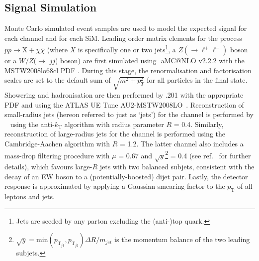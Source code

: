 \subsection{Signal Simulation}
\label{signal_generation}
Monte Carlo simulated event samples are used to model the expected signal for each channel and for each SiM. Leading order matrix elements for the process $pp \rightarrow \mathrm{X} + \chi\bar{\chi}$ (where $X$ is specifically one or two jets\footnote{Jets are seeded by any parton excluding the (anti-)top quark.}, a $Z(\rightarrow \ell^+ \ell^-)$ boson or a $W/Z(\rightarrow$ $jj$) boson) are first simulated using \MGnospace$\_$aMC$@$NLO v2.2.2 \cite{MG_aMCNLO2014} with the MSTW2008lo68cl PDF \cite{MSTW}. During this stage, the renormalisation and factorisation scales are set to the default sum of $\sqrt{m^{2} + p_{T}^{2}}$ for all particles in the final state. Showering and hadronisation are then performed by \PYTHIA.201 \cite{pythia8} with the appropriate PDF and using the ATLAS UE Tune AU2-MSTW2008LO~\cite{AUtune}. Reconstruction of small-radius jets (hereon referred to just as `jets') for the \monojet channel is performed by \FASTJET~\cite{FastJet} using the anti-$k_{\mathrm{T}}$ algorithm with radius parameter $R$ = 0.4. Similarly, reconstruction of large-radius jets for the \monoWZ channel is performed using the Cambridge-Aachen algorithm with $R$ = 1.2. The latter channel also includes a mass-drop filtering procedure with $\mu$ = 0.67 and $\sqrt{y}$\footnote{$\sqrt{y} = \mathrm{min}(p_{\mathrm{T}_{j1}},p_{\mathrm{T}_{j2}})\Delta R / m_{jet}$ is the momentum balance of the two leading subjets.} = 0.4 (see ref.~\cite{massdrop} for further details), which favours large-$R$ jets with two balanced subjets, consistent with the decay of an EW boson to a (potentially-boosted) dijet pair. Lastly, the detector response is approximated by applying a Gaussian smearing factor to the $p_{\mathrm{T}}$ of all leptons and jets.

